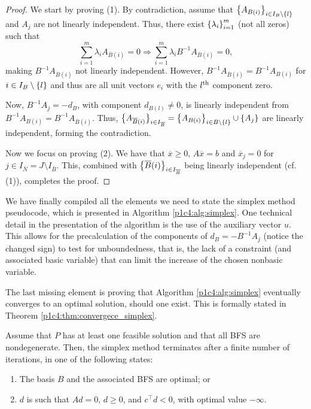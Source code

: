 \begin{proof}
	 We start by proving (1). By contradiction, assume that $\left\{ A_{B(i)} \right \}_{i \in I_B \setminus \left\{ l \right \}}$ and $A_j$ are not linearly independent. Thus, there exist $\left\{ \lambda_i \right \}_{i=1}^m$ (not all zeros) such that
	\begin{equation*}
			\sum_{i=1}^m \lambda_i A_{\overline{B}(i)} = 0 \Rightarrow \sum_{i=1}^m \lambda_i B^{-1}A_{\overline{B}(i)} = 0,
	\end{equation*}
	making $B^{-1}A_{\overline{B}(i)}$ not linearly independent. However, $B^{-1}A_{\overline{B}(i)} = B^{-1}A_{B(i)}$ for $i \in I_B \setminus \left\{ l \right \}$ and thus are all unit vectors $e_i$ with the $l^\text{th}$ component zero. 

	Now, $B^{-1}A_j = -d_B$, with component $d_{B(l)} \neq 0$, is linearly independent from $B^{-1}A_{B(i)} = B^{-1}A_{\overline{B}(i)}$. Thus, $\big\{A_{\overline{B}(i)}\big\}_{i \in I_{\overline{B}}} = \left\{ A_{B(i)} \right \}_{i \in B \setminus \left\{ l \right \}} \cup \left\{ A_j \right \}$ are linearly independent, forming the contradiction.
	
	Now we focus on proving (2). We have that $\overline{x} \geq 0$, $A\overline{x} = b$ and $\overline{x}_j = 0$ for $j \in I_{\overline{N}} = J \setminus I_{\overline{B}}$. This, combined with $\left\{ \overline{B}(i) \right \}_{i \in I_{\overline{B}}}$ being linearly independent (cf. (1)), completes the proof.	
\end{proof}

We have finally compiled all the elements we need to state the simplex method pseudocode, which is presented in Algorithm \ref{p1c4:alg:simplex}. One technical detail in the presentation of the algorithm is the use of the auxiliary vector $u$. This allows for the precalculation of the components of $d_B = -B^{-1}A_j$ (notice the changed sign) to test for unboundedness, that is, the lack of a constraint (and associated basic variable) that can limit the increase of the chosen nonbasic variable. 

The last missing element is proving that Algorithm \ref{p1c4:alg:simplex} eventually converges to an optimal solution, should one exist. This is formally stated in Theorem \ref{p1c4:thm:convergece_simplex}.

\begin{theorem}\label{p1c4:thm:convergece_simplex}
	Assume that $P$ has at least one feasible solution and that all BFS are nondegenerate. Then, the simplex method terminates after a finite number of iterations, in one of the following states:
	\begin{enumerate}
		\item[(1)] The basis $B$ and the associated BFS are optimal; or
		\item[(2)] $d$ is such that $Ad = 0$, $d \geq 0$, and $c^\top d < 0$, with optimal value $-\infty$.	
	\end{enumerate}
\end{theorem}

